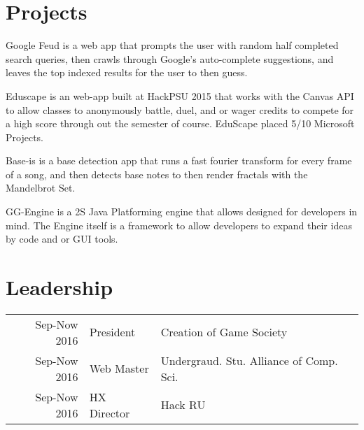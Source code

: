 \documentclass[]{deedy-resume-openfont}
\begin{document}
\begin{minipage}[t]{0.66\textwidth}
\section{Projects}
Google Feud is a web app that prompts the user with random half completed search queries, then crawls through Google's auto-complete suggestions, and leaves the top indexed results for the user to then guess. 
\sectionsep

Eduscape is an web-app built at HackPSU 2015 that works with the Canvas API to allow classes to anonymously battle, duel, and or wager credits to compete for a high score through out the semester of course. EduScape placed 5/10 Microsoft Projects.  
\sectionsep

Base-is is a base detection app that runs a fast fourier transform for every frame of a song, and then detects base notes to then render fractals with the Mandelbrot Set. 
\sectionsep

GG-Engine is a 2S Java Platforming engine that allows designed for developers in mind. The Engine itself is a framework to allow developers to expand their ideas by code and or GUI tools.
\sectionsep


\section{Leadership} 
\begin{tabular}{rll}
Sep-Now 2016 & President  & Creation of Game Society\\
Sep-Now 2016 & Web Master & Undergraud. Stu. Alliance of Comp. Sci. \\
Sep-Now 2016 & HX Director  & Hack RU \\ 


\end{tabular}
\sectionsep

\end{minipage} 
\end{document}
